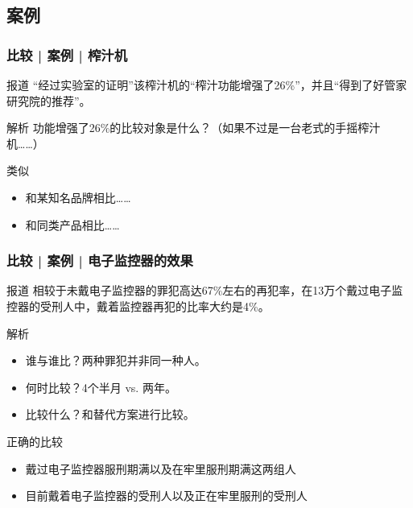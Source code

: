 \subsection{案例}
\begin{frame}
  \frametitle{比较 | 案例 | 榨汁机}
  \begin{block}{报道}
    “经过实验室的证明”该榨汁机的“榨汁功能增强了26\%”，并且“得到了好管家研究院的推荐”。
  \end{block}
  \pause \pause \pause \pause
  \begin{block}{解析}
    功能增强了26\%的比较对象是什么？（如果不过是一台老式的手摇榨汁机……）
  \end{block}
  \pause
  \begin{block}{类似}
    \begin{itemize}
      \item 和某知名品牌相比……
      \item 和同类产品相比……
    \end{itemize}
  \end{block}
\end{frame}

\begin{frame}
  \frametitle{比较 | 案例 | 电子监控器的效果}
  \begin{block}{报道}
    相较于未戴电子监控器的罪犯高达67\%左右的再犯率，在13万个戴过电子监控器的受刑人中，戴着监控器再犯的比率大约是4\%。
  \end{block}
  \pause \pause \pause \pause
  \begin{block}{解析}
    \begin{itemize}
      \item 谁与谁比？两种罪犯并非同一种人。
      \item 何时比较？4个半月 vs. 两年。
      \item 比较什么？和替代方案进行比较。
    \end{itemize}
  \end{block}
  \pause
  \begin{block}{正确的比较}
    \begin{itemize}
      \item 戴过电子监控器服刑期满以及在牢里服刑期满这两组人
      \item 目前戴着电子监控器的受刑人以及正在牢里服刑的受刑人
    \end{itemize}
  \end{block}
\end{frame}

